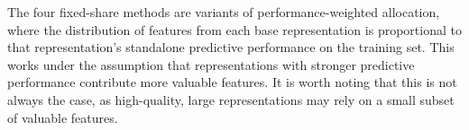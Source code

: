 




The four fixed-share methods are variants of performance-weighted allocation, where the distribution of features from each base representation is proportional to that representation's standalone predictive performance on the training set. This works under the assumption that representations with stronger predictive performance contribute more valuable features. It is worth noting that this is not always the case, as high-quality, large representations may rely on a small subset of valuable features.

